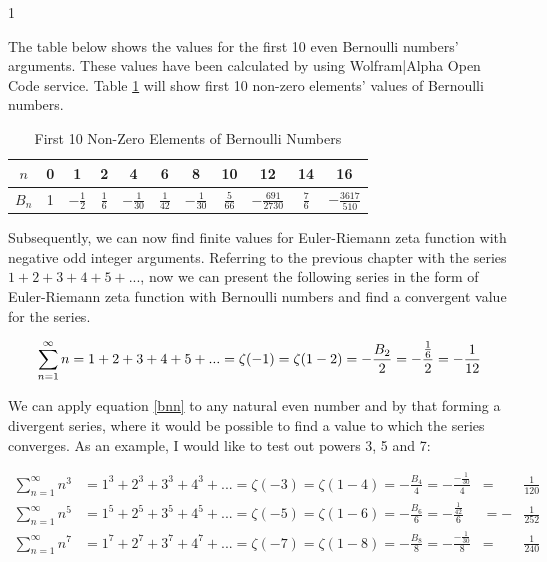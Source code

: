 1\documentclass[a4paper]{article}
\begin{document}
The table below shows the values for the first 10 even Bernoulli numbers' arguments. These values
have been calculated by using Wolfram|Alpha Open Code service. Table \ref{tab:bernoulli} will show
first 10 non-zero elements' values of Bernoulli numbers.

\begin{table}[h!]
  \begin{center}
    \begin{tabular}{c | c | c | c | c | c | c | c | c | c | c}
      $n$ & 0 & 1 & 2 & 4 & 6 & 8 & 10 & 12 & 14 & 16\\
      \hline
      $B_n$ & 1 & $-\frac{1}{2}$ & $\frac{1}{6}$ & $-\frac{1}{30}$
      & $\frac{1}{42}$ & $-\frac{1}{30}$ & $\frac{5}{66}$ & $-\frac{691}{2730}$
      & $\frac{7}{6}$ & $-\frac{3617}{510}$\\
    \end{tabular}
    \caption{First 10 Non-Zero Elements of Bernoulli Numbers}
    \label{tab:bernoulli}
  \end{center}
 \end{table}

Subsequently, we can now find finite values for Euler-Riemann zeta function with negative odd
integer arguments. Referring to the previous chapter with the series $1+2+3+4+5+...$, now
we can present the following series in the form of Euler-Riemann zeta function with Bernoulli
numbers and find a convergent value for the series.

\begin{equation}
  \sum_{n=1}^{\infty} n = 1+2+3+4+5+...=\zeta(-1)=\zeta(1-2)=-\frac{B_2}{2}=
  -\frac{\frac{1}{6}}{2}=-\frac{1}{12}\\
  \end{equation}

We can apply equation \ref{bnn} to any natural even number and by that forming a divergent series,
where it would be possible to find a value to which the series converges. As an example, I would like
to test out powers 3, 5 and 7:

\begin{align*}
  \sum_{n=1}^{\infty}n^3&=1^3+2^3+3^3+4^3+...=\zeta(-3)=\zeta(1-4)=
  -\frac{B_4}{4}=-\frac{-\frac{1}{30}}{4}&=&\frac{1}{120}\\
  \sum_{n=1}^{\infty}n^5&=1^5+2^5+3^5+4^5+...=\zeta(-5)=\zeta(1-6)=
  -\frac{B_6}{6}=-\frac{\frac{1}{42}}{6}&=-&\frac{1}{252}\\
  \sum_{n=1}^{\infty}n^7&=1^7+2^7+3^7+4^7+...=\zeta(-7)=\zeta(1-8)=
  -\frac{B_8}{8}=-\frac{-\frac{1}{30}}{8}&=&\frac{1}{240}\\
\end{align*}
\end{document}
